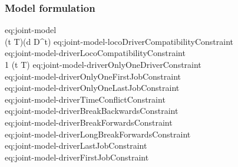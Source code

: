 \subsubsection{Model formulation}
\begin{lmip}{eq:joint-model}
\\
 {(\forall t \in T)(\forall d \in D^t)} {eq:joint-model-locoDriverCompatibilityConstraint}\\
 {eq:joint-model-driverLocoCompatibilityConstraint}\\
 {\leq} {1} {(\forall t \in T)} {eq:joint-model-driverOnlyOneDriverConstraint}\\
 {eq:joint-model-driverOnlyOneFirstJobConstraint}\\
 {eq:joint-model-driverOnlyOneLastJobConstraint}\\
 {eq:joint-model-driverTimeConflictConstraint}\\
 {eq:joint-model-driverBreakBackwardsConstraint}\\
 {eq:joint-model-driverBreakForwardsConstraint}\\
 {eq:joint-model-driverLongBreakForwardsConstraint}\\
 {eq:joint-model-driverLastJobConstraint}\\
 {eq:joint-model-driverFirstJobConstraint}\\

\end{lmip}
